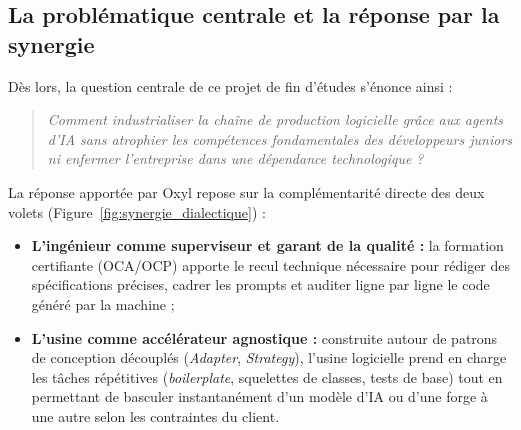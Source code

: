 \documentclass{tnreport}
\begin{document}
\subsection{La problématique centrale et la réponse par la synergie}
\label{subsec:synergie_dialectique}

Dès lors, la question centrale de ce projet de fin d'études s'énonce ainsi :

\begin{quote}
    \itshape
    Comment industrialiser la chaîne de production logicielle grâce aux agents d'IA sans atrophier les compétences fondamentales des développeurs juniors ni enfermer l'entreprise dans une dépendance technologique ?
\end{quote}

La réponse apportée par Oxyl repose sur la complémentarité directe des deux volets (Figure~\ref{fig:synergie_dialectique}) :
\begin{itemize}
    \item \textbf{L'ingénieur comme superviseur et garant de la qualité :} la formation certifiante (OCA/OCP) apporte le recul technique nécessaire pour rédiger des spécifications précises, cadrer les prompts et auditer ligne par ligne le code généré par la machine ;
    \item \textbf{L'usine comme accélérateur agnostique :} construite autour de patrons de conception découplés (\textit{Adapter}, \textit{Strategy}), l'usine logicielle prend en charge les tâches répétitives (\textit{boilerplate}, squelettes de classes, tests de base) tout en permettant de basculer instantanément d'un modèle d'IA ou d'une forge à une autre selon les contraintes du client.
\end{itemize}
\end{document}
